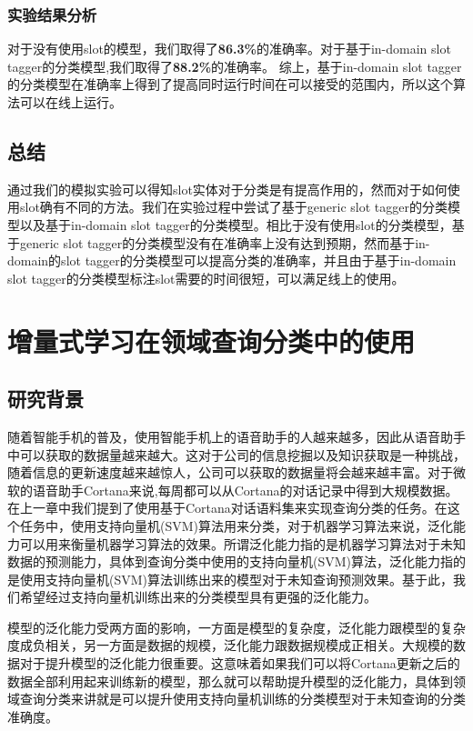 \documentclass[master]{njuthesis}
\begin{document}
\subsection{实验结果分析}

    对于没有使用slot的模型，我们取得了\large{\textbf{86.3\%}}的准确率。对于基于in-domain slot tagger的分类模型,我们取得了\large{\textbf{88.2\%}}的准确率。
    综上，基于in-domain slot tagger的分类模型在准确率上得到了提高同时运行时间在可以接受的范围内，所以这个算法可以在线上运行。

\section{总结}

    通过我们的模拟实验可以得知slot实体对于分类是有提高作用的，然而对于如何使用slot确有不同的方法。我们在实验过程中尝试了基于generic slot tagger的分类模型以及基于in-domain slot tagger的分类模型。相比于没有使用slot的分类模型，基于generic slot tagger的分类模型没有在准确率上没有达到预期，然而基于in-domain的slot tagger的分类模型可以提高分类的准确率，并且由于基于in-domain slot tagger的分类模型标注slot需要的时间很短，可以满足线上的使用。
\chapter{增量式学习在领域查询分类中的使用}\label{chapter_incremental}

\section{研究背景}

   随着智能手机的普及，使用智能手机上的语音助手的人越来越多，因此从语音助手中可以获取的数据量越来越大。这对于公司的信息挖掘以及知识获取是一种挑战，随着信息的更新速度越来越惊人，公司可以获取的数据量将会越来越丰富。对于微软的语音助手Cortana来说,每周都可以从Cortana的对话记录中得到大规模数据。在上一章中我们提到了使用基于Cortana对话语料集来实现查询分类的任务。在这个任务中，使用支持向量机(SVM)算法用来分类，对于机器学习算法来说，泛化能力可以用来衡量机器学习算法的效果。所谓泛化能力指的是机器学习算法对于未知数据的预测能力，具体到查询分类中使用的支持向量机(SVM)算法，泛化能力指的是使用支持向量机(SVM)算法训练出来的模型对于未知查询预测效果。基于此，我们希望经过支持向量机训练出来的分类模型具有更强的泛化能力。
   
   模型的泛化能力受两方面的影响，一方面是模型的复杂度，泛化能力跟模型的复杂度成负相关，另一方面是数据的规模，泛化能力跟数据规模成正相关。大规模的数据对于提升模型的泛化能力很重要。这意味着如果我们可以将Cortana更新之后的数据全部利用起来训练新的模型，那么就可以帮助提升模型的泛化能力，具体到领域查询分类来讲就是可以提升使用支持向量机训练的分类模型对于未知查询的分类准确度。
   
\end{document}
